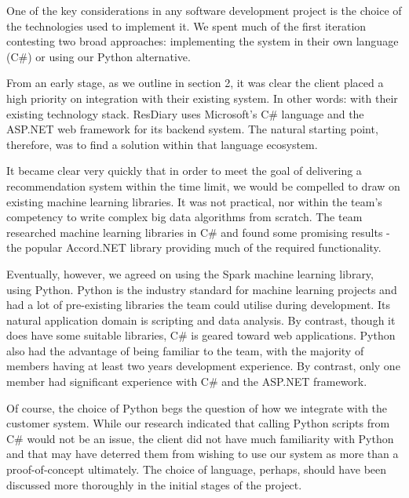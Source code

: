 \documentclass{l3proj}
\begin{document}


One of the key considerations in any software development project is the choice of the technologies used to implement it. We spent much of the first iteration contesting two broad approaches: implementing the system in their own language (C\#) or using our Python alternative.

From an early stage, as we outline in section 2, it was clear the client placed a high priority on integration with their existing system. In other words: with their existing technology stack. ResDiary uses Microsoft's C\# language and the ASP.NET web framework for its backend system. The natural starting point, therefore, was to find a solution within that language ecosystem. 

It became clear very quickly that in order to meet the goal of delivering a recommendation system within the time limit, we would be compelled to draw on existing machine learning libraries. It was not practical, nor within the team’s competency to write complex big data algorithms from scratch. The team researched machine learning libraries in C\# and found some promising results - the popular Accord.NET library providing much of the required functionality. 

Eventually, however, we agreed on using the Spark machine learning library, using Python. Python is the industry standard for machine learning projects and had a lot of pre-existing libraries the team could utilise during development. Its natural application domain is scripting and data analysis. By contrast, though it does have some suitable libraries, C\# is geared toward web applications. Python also had the advantage of being familiar to the team, with the majority of members having at least two years development experience. By contrast, only one member had significant experience with C\# and the ASP.NET framework.

Of course, the choice of Python begs the question of how we integrate with the customer system. While our research indicated that calling Python scripts from C\# would not be an issue, the client did not have much familiarity with Python and that may have deterred them from wishing to use our system as more than a proof-of-concept ultimately. The choice of language, perhaps, should have been discussed more thoroughly in the initial stages of the project.
\end{document}
